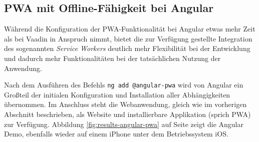 \documentclass[a4paper,12pt,twoside]{scrreprt}
\begin{document}
\subsection{\acs{PWA} mit Offline-Fähigkeit bei Angular}
\label{sub-sec:results-pwa-angular}
Während die Konfiguration der \ac{PWA}-Funktionalität bei Angular etwas mehr Zeit als bei Vaadin in Anspruch nimmt, bietet die zur Verfügung gestellte Integration des sogenannten \textit{Service Workers} deutlich mehr Flexibilität bei der Entwicklung und dadurch mehr  Funktionalitäten bei der tatsächlichen Nutzung der Anwendung.

\medskip

Nach dem Ausführen des Befehls \texttt{ng add @angular-pwa} wird von Angular ein Großteil der initialen Konfiguration und Installation aller Abhängigkeiten übernommen. Im Anschluss steht die Webanwendung, gleich wie im vorherigen Abschnitt beschrieben, als Website und installierbare Applikation (sprich \ac{PWA}) zur Verfügung. Abbildung \ref{fig:results-angular-pwa} auf Seite \pageref{fig:results-angular-pwa} zeigt die Angular Demo, ebenfalls wieder auf einem iPhone unter dem Betriebssystem iOS.
\end{document}
